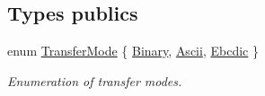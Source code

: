 \subsection*{Types publics}
\begin{DoxyCompactItemize}
\item 
enum \hyperlink{classsf_1_1Ftp_a1cd6b89ad23253f6d97e6d4ca4d558cb}{Transfer\+Mode} \{ \hyperlink{classsf_1_1Ftp_a1cd6b89ad23253f6d97e6d4ca4d558cba6f253b362639fb5e059dc292762a21ee}{Binary}, 
\hyperlink{classsf_1_1Ftp_a1cd6b89ad23253f6d97e6d4ca4d558cbac9e544a22dce8ef3177449cb235d15c2}{Ascii}, 
\hyperlink{classsf_1_1Ftp_a1cd6b89ad23253f6d97e6d4ca4d558cbabb1e34435231e73c96534c71090be7f4}{Ebcdic}
 \}\begin{DoxyCompactList}\small\item\em Enumeration of transfer modes. \end{DoxyCompactList}
\end{DoxyCompactItemize}
